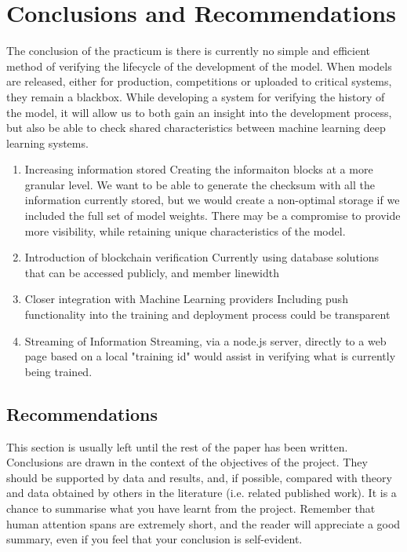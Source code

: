 \section{Conclusions and Recommendations}

The conclusion of the practicum is there is currently no simple and efficient method of verifying the lifecycle of the development of the model. When models are released, either for production, competitions or uploaded to critical systems, they remain a blackbox. While developing a system for verifying the history of the model, it will allow us to both gain an insight into the development process, but also be able to check shared characteristics between machine learning deep learning systems.

\begin{enumerate}
    \item 
    Increasing information stored
    Creating the informaiton blocks at a more granular level. We want to be able to generate the checksum with all the information currently stored, but we would create a non-optimal storage if we included the full set of model weights. There may be a compromise to provide more visibility, while retaining unique characteristics of the model.
    
    \item 
    Introduction of blockchain verification
    Currently using database solutions that can be accessed publicly, and member linewidth
    
    \item 
    Closer integration with Machine Learning providers
    Including push functionality into the training and deployment process could be transparent
    
    \item 
    Streaming of Information
    Streaming, via a node.js server, directly to a web page based on a local "training id" would assist in verifying what is currently being trained.
\end{enumerate}


\subsection{Recommendations}


This section is usually left until the rest of the paper has been written. Conclusions are drawn in the context of the objectives of the project. They should be supported by data and results, and, if possible, compared with theory and data obtained by others in the literature (i.e. related published work). It is a chance to summarise what you have learnt from the project. Remember that human attention spans are extremely short, and the reader will appreciate a good summary, even if you feel that your conclusion is self-evident.

